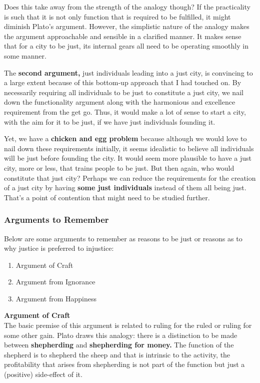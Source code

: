 \documentclass[12pt, letterpaper]{article}
\begin{document}
Does this take away from the strength of the analogy though? If the practicality is such that it is not only function that is required to be fulfilled, it might diminish Plato's argument. However, the simplistic nature of the analogy makes the argument approachable and sensible in a clarified manner. It makes sense that for a city to be just, its internal gears all need to be operating smoothly in some manner.

The \textbf{second argument,} just individuals leading into a just city, is convincing to a large extent because of this bottom-up approach that I had touched on. By necessarily requiring all individuals to be just to constitute a just city, we nail down the functionality argument along with the harmonious and excellence requirement from the get go. Thus, it would make a lot of sense to start a city, with the aim for it to be just, if we have just individuals founding it.

Yet, we have a \textbf{chicken and egg problem} because although we would love to nail down these requirements initially, it seems idealistic to believe all individuals will be just before founding the city. It would seem more plausible to have a just city, more or less, that trains people to be just. But then again, who would constitute that just city? Perhaps we can reduce the requirements for the creation of a just city by having \textbf{some just individuals} instead of them all being just. That's a point of contention that might need to be studied further.

\subsubsection{Arguments to Remember}
Below are some arguments to remember as reasons to be just or reasons as to why justice is preferred to injustice:
\begin{enumerate}
	\item Argument of Craft
	\item Argument from Ignorance
	\item Argument from Happiness
\end{enumerate}
\textbf{Argument of Craft}\\
The basic premise of this argument is related to ruling for the ruled or ruling for some other gain. Plato draws this analogy: there is a distinction to be made between \textbf{shepherding} and \textbf{shepherding for money.} The function of the shepherd is to shepherd the sheep and that is intrinsic to the activity, the profitability that arises from shepherding is not part of the function but just a (positive) side-effect of it.
\end{document}
